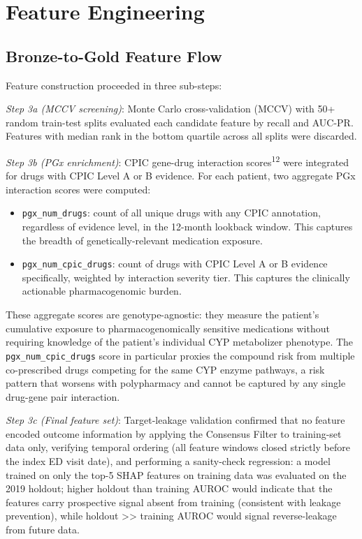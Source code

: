 \documentclass[
  12pt,
]{book}
\providecommand{\tightlist}{%
  \setlength{\itemsep}{0pt}\setlength{\parskip}{0pt}}
\begin{document}
\section{Feature Engineering}\label{sec-features}

\subsection{Bronze-to-Gold Feature
Flow}\label{bronze-to-gold-feature-flow}

Feature construction proceeded in three sub-steps:

\emph{Step 3a (MCCV screening)}: Monte Carlo cross-validation (MCCV)
with 50+ random train-test splits evaluated each candidate feature by
recall and AUC-PR. Features with median rank in the bottom quartile
across all splits were discarded.

\emph{Step 3b (PGx enrichment)}: CPIC gene-drug interaction
scores\textsuperscript{12} were integrated for drugs with CPIC Level A
or B evidence. For each patient, two aggregate PGx interaction scores
were computed:

\begin{itemize}
\tightlist
\item
  \texttt{pgx\_num\_drugs}: count of all unique drugs with any CPIC
  annotation, regardless of evidence level, in the 12-month lookback
  window. This captures the breadth of genetically-relevant medication
  exposure.
\item
  \texttt{pgx\_num\_cpic\_drugs}: count of drugs with CPIC Level A or B
  evidence specifically, weighted by interaction severity tier. This
  captures the clinically actionable pharmacogenomic burden.
\end{itemize}

These aggregate scores are genotype-agnostic: they measure the patient's
cumulative exposure to pharmacogenomically sensitive medications without
requiring knowledge of the patient's individual CYP metabolizer
phenotype. The \texttt{pgx\_num\_cpic\_drugs} score in particular
proxies the compound risk from multiple co-prescribed drugs competing
for the same CYP enzyme pathways, a risk pattern that worsens with
polypharmacy and cannot be captured by any single drug-gene pair
interaction.

\emph{Step 3c (Final feature set)}: Target-leakage validation confirmed
that no feature encoded outcome information by applying the Consensus
Filter to training-set data only, verifying temporal ordering (all
feature windows closed strictly before the index ED visit date), and
performing a sanity-check regression: a model trained on only the top-5
SHAP features on training data was evaluated on the 2019 holdout; higher
holdout than training AUROC would indicate that the features carry
prospective signal absent from training (consistent with leakage
prevention), while holdout \textgreater\textgreater{} training AUROC
would signal reverse-leakage from future data.
\end{document}
